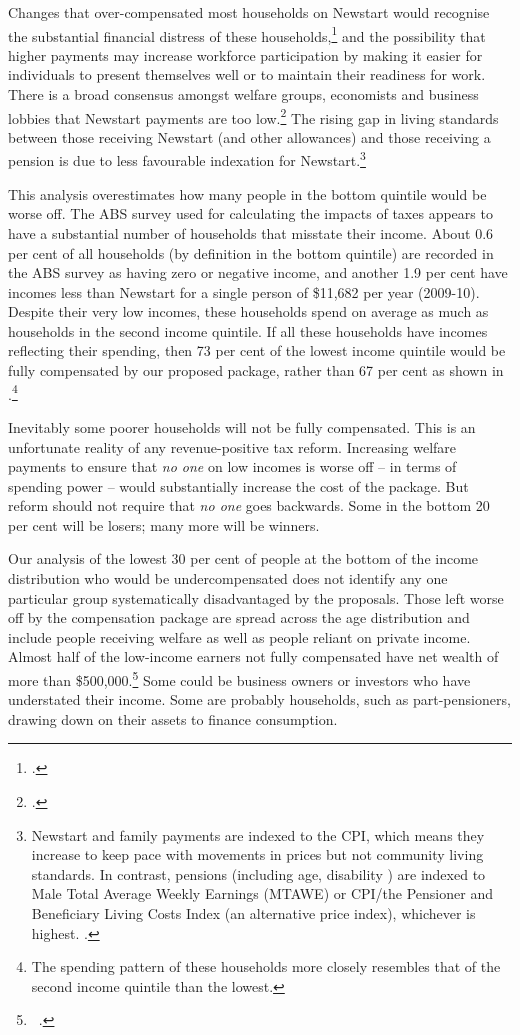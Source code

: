 \documentclass{grattanAlpha}
\begin{document}
Changes that over-compensated most households on Newstart would recognise the substantial financial distress of these households,\footcite[][18--19]{DaleyMcGannonEtAl2013}  and the possibility that higher payments may increase workforce participation by making it easier for individuals to present themselves well or to maintain their readiness for work.  There is a broad consensus amongst welfare groups, economists and business lobbies that Newstart payments are too low.\footcite[][3]{BCA2012}  The rising gap in living standards between those receiving Newstart (and other allowances) and those receiving a pension is due to less favourable indexation for Newstart.\footnote{Newstart and family payments are indexed to the CPI, which means they increase to keep pace with movements in prices but not community living standards. In contrast, pensions (including age, disability \etc) are indexed to Male Total Average Weekly Earnings (MTAWE) or CPI/the Pensioner and Beneficiary Living Costs Index (an alternative price index), whichever is highest. \textcite{DSS2015}. }  

This analysis overestimates how many people in the bottom quintile would be worse off. The ABS survey used for calculating the impacts of taxes appears to have a substantial number of households that misstate their income. About 0.6 per cent of all households (by definition in the bottom quintile) are recorded in the ABS survey as having zero or negative income, and another 1.9 per cent have incomes less than Newstart for a single person of \$11,682 per year (2009-10). Despite their very low incomes, these households spend on average as much as households in the second income quintile. If all these households have incomes reflecting their spending, then 73 per cent of the lowest income quintile would be fully compensated by our proposed package, rather than 67 per cent as shown in .\footnote{The spending pattern of these households more closely resembles that of the second income quintile than the lowest.}

Inevitably some poorer households will not be fully compensated. This is an unfortunate reality of any revenue-positive tax reform. Increasing welfare payments to ensure that \emph{no one} on low incomes is worse off – in terms of spending power – would substantially increase the cost of the package. But reform should not require that \emph{no one} goes backwards. Some in the bottom 20 per cent will be losers; many more will be winners. 

Our analysis of the lowest 30 per cent of people at the bottom of the income distribution who would be undercompensated does not identify any one particular group systematically disadvantaged by the proposals. Those left worse off by the compensation package are spread across the age distribution and include people receiving welfare as well as people reliant on private income. Almost half of the low-income earners not fully compensated have net wealth of more than \$500,000.\footnote{\gao\ \textcite{ABS2013-HES-2011-12-CURF}.}  Some could be business owners or investors who have understated their income. Some are probably households, such as part-pensioners, drawing down on their assets to finance consumption. 
\end{document}
